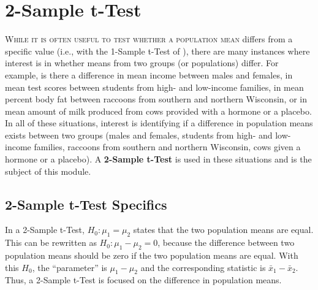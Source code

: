 \documentclass[10pt,openany]{book}\usepackage[]{graphicx}\usepackage[]{color}
\begin{document}
  \frontmatter
    

  \mainmatter



















\chapter{2-Sample t-Test} \label{chap:tTest2}

\vspace*{-12pt}
\minitoc
\vspace*{24pt}

\lettrine{W}{hile it is often useful to test whether a population mean} differs from a specific value (i.e., with the 1-Sample t-Test of ), there are many instances where interest is in whether means from two groups (or populations) differ. For example, is there a difference in mean income between males and females, in mean test scores between students from high- and low-income families, in mean percent body fat between raccoons from southern and northern Wisconsin, or in mean amount of milk produced from cows provided with a hormone or a placebo. In all of these situations, interest is identifying if a difference in population means exists between two groups (males and females, students from high- and low-income families, raccoons from southern and northern Wisconsin, cows given a hormone or a placebo). A \textbf{2-Sample t-Test} is used in these situations and is the subject of this module.


\section{2-Sample t-Test Specifics}
\vspace*{-3pt}
In a 2-Sample t-Test, $H_{0}:\mu_{1}=\mu_{2}$ states that the two population means are equal. This can be rewritten as $H_{0}:\mu_{1}-\mu_{2}=0$, because the difference between two population means should be zero if the two population means are equal. With this $H_{0}$, the ``parameter'' is $\mu_{1}-\mu_{2}$ and the corresponding statistic is $\bar{x}_{1}-\bar{x}_{2}$. Thus, a 2-Sample t-Test is focused on the difference in population means.
\end{document}

